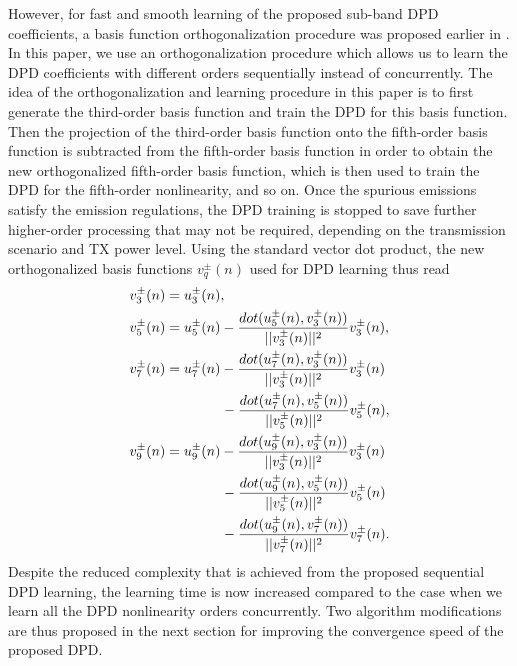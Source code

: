 However, for fast and smooth learning of the proposed sub-band DPD coefficients, a basis function orthogonalization procedure was proposed earlier in \cite{TMTT_SubbandDPD}. 
In this paper, we use an orthogonalization procedure which allows us to learn the DPD coefficients with different orders sequentially instead of concurrently. 
The idea of the orthogonalization and learning procedure in this paper is to first generate the third-order basis function and train the DPD for this basis function. 
Then the projection of the third-order basis function onto the fifth-order basis function is subtracted from the fifth-order basis function in order to obtain the new orthogonalized fifth-order basis function, which is then used to train the DPD for the fifth-order nonlinearity, and so on. 
Once the spurious emissions satisfy the emission regulations, the DPD training is stopped to save further higher-order processing that may not be required, depending on the transmission scenario and TX power level. 
Using the standard vector dot product, the new orthogonalized basis functions $v^\pm_q(n)$ used for DPD learning thus read
\begin{align}
\small
v^\pm_3(n) &= u^\pm_3(n), \label{eq:IM3_OrthBasis_1} \\
v^\pm_5(n) &= u^\pm_5(n) - \frac{dot(u^\pm_5(n),v^\pm_3(n))}{||v^\pm_3(n)||^2} v^\pm_3(n), \label{eq:IM3_OrthBasis_2} \\
v^\pm_7(n) &= u^\pm_7(n)   - \frac{dot(u^\pm_7(n),v^\pm_3(n))}{||v^\pm_3(n)||^2} v^\pm_3(n) \nonumber\\
&\:\:\:\:\:\:\:\:\:\:\:\:\:\:\:\:\:\: - \frac{dot(u^\pm_7(n),v^\pm_5(n))}{||v^\pm_5(n)||^2} v^\pm_5(n), \label{eq:IM3_OrthBasis_3}\\
v^\pm_9(n) &= u^\pm_9(n) - \frac{dot(u^\pm_9(n),v^\pm_3(n))}{||v^\pm_3(n)||^2} v^\pm_3(n) \nonumber\\
&\:\:\:\:\:\:\:\:\:\:\:\:\:\:\:\:\:\: - \frac{dot(u^\pm_9(n),v^\pm_5(n))}{||v^\pm_5(n)||^2} v^\pm_5(n) \nonumber\\ 
&\:\:\:\:\:\:\:\:\:\:\:\:\:\:\:\:\:\:	- \frac{dot(u^\pm_9(n),v^\pm_7(n))}{||v^\pm_7(n)||^2} v^\pm_7(n). \label{eq:IM3_OrthBasis_4}
\end{align}
\normalsize
Despite the reduced complexity that is achieved from the proposed sequential DPD learning, the learning time is now increased compared to the case when we learn all the DPD nonlinearity orders concurrently. 
Two algorithm modifications are thus proposed in the next section for improving the convergence speed of the proposed DPD.

